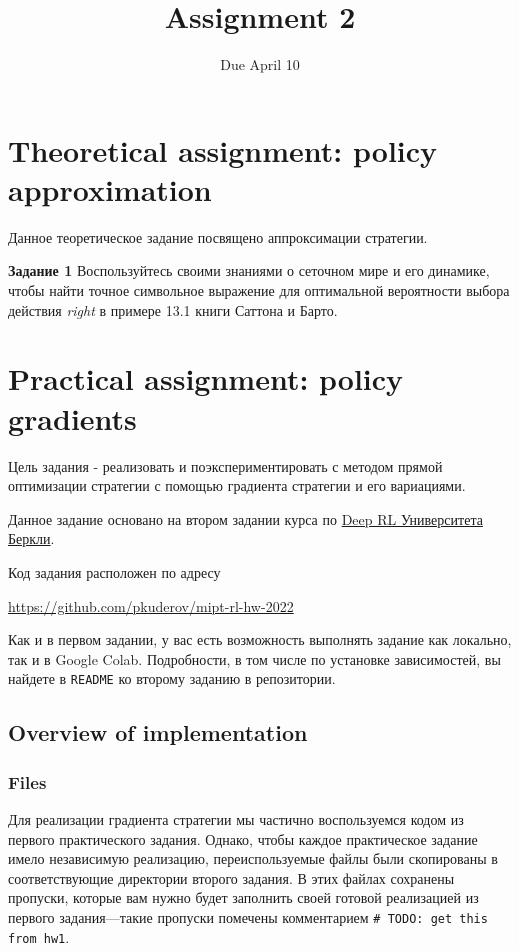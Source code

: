 \documentclass[12pt, oneside]{article}
\author{Due April 10}
\title{Assignment 2}
\date{}
\begin{document}
\maketitle
\thispagestyle{fancy}

\section{Theoretical assignment: policy approximation}

Данное теоретическое задание посвящено аппроксимации стратегии.

\textbf{Задание 1} Воспользуйтесь своими знаниями о сеточном мире и его динамике, чтобы найти точное символьное выражение для оптимальной вероятности выбора действия \textit{right} в примере 13.1 книги Саттона и Барто.

\section{Practical assignment: policy gradients}

Цель задания - реализовать и поэкспериментировать с методом прямой оптимизации стратегии с помощью градиента стратегии и его вариациями.

Данное задание основано на втором задании курса по \href{http://rail.eecs.berkeley.edu/deeprlcourse/}{Deep RL Университета Беркли}.

Код задания расположен по адресу
\begin{center}
    \href{https://github.com/pkuderov/mipt-rl-hw-2022}{https://github.com/pkuderov/mipt-rl-hw-2022}
\end{center}

Как и в первом задании, у вас есть возможность выполнять задание как локально, так и в Google Colab. Подробности, в том числе по установке зависимостей, вы найдете в \verb|README| ко второму заданию в репозитории.

\subsection{Overview of implementation}

\subsubsection{Files}

Для реализации градиента стратегии мы частично воспользуемся кодом из первого практического задания. Однако, чтобы каждое практическое задание имело независимую реализацию, переиспользуемые файлы были скопированы в соответствующие директории второго задания. В этих файлах сохранены пропуски, которые вам нужно будет заполнить своей готовой реализацией из первого задания---такие пропуски помечены комментарием \verb|# TODO: get this from hw1|.
\end{document}
